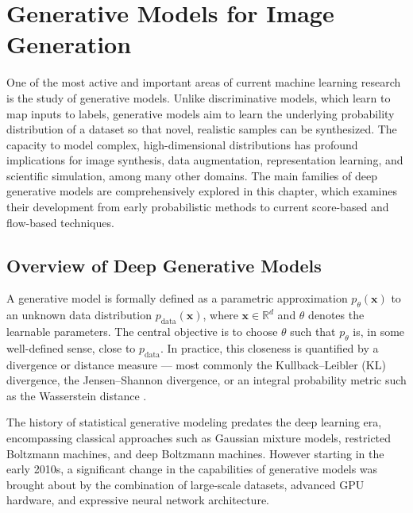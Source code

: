 \chapter{Generative Models for Image Generation}
\label{chap:generative_models}

One of the most active and important areas of current machine learning research is the study of generative models. Unlike discriminative models, which
learn to map inputs to labels, generative models aim to learn the underlying
probability distribution of a dataset so that novel, realistic samples can be
synthesized. The capacity to model complex, high-dimensional distributions has
profound implications for image synthesis, data augmentation, representation
learning, and scientific simulation, among many other domains. The main families of deep generative models are comprehensively explored in this chapter, which examines their development from early probabilistic methods to current score-based and flow-based techniques.


\section{Overview of Deep Generative Models}
\label{sec:overview_generative}

A generative model is formally defined as a parametric approximation
$p_\theta(\mathbf{x})$ to an unknown data distribution $p_{\text{data}}(\mathbf{x})$,
where $\mathbf{x} \in \mathbb{R}^d$ and $\theta$ denotes the learnable parameters.
The central objective is to choose $\theta$ such that $p_\theta$ is, in some
well-defined sense, close to $p_{\text{data}}$. In practice, this closeness is
quantified by a divergence or distance measure — most commonly the
Kullback--Leibler (KL) divergence, the Jensen--Shannon divergence, or an
integral probability metric such as the Wasserstein distance
\cite{villani2009optimal}.

The history of statistical generative modeling predates the deep learning era,
encompassing classical approaches such as Gaussian mixture models, restricted
Boltzmann machines, and deep Boltzmann machines. However starting in the early 2010s, a significant change in the capabilities of generative models was brought about by the combination of large-scale datasets, advanced GPU hardware, and expressive neural network architecture.

